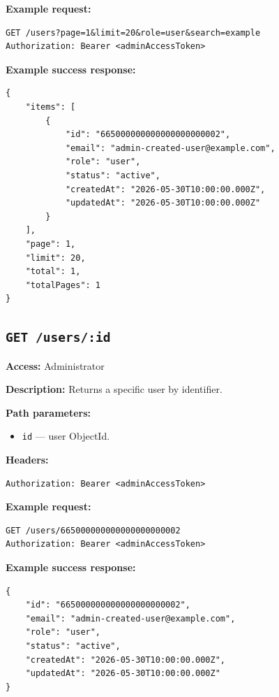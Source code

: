 \textbf{Example request:}

\begin{verbatim}
GET /users?page=1&limit=20&role=user&search=example
Authorization: Bearer <adminAccessToken>
\end{verbatim}

\pagebreak
\textbf{Example success response:}

\begin{verbatim}
{
    "items": [
        {
            "id": "665000000000000000000002",
            "email": "admin-created-user@example.com",
            "role": "user",
            "status": "active",
            "createdAt": "2026-05-30T10:00:00.000Z",
            "updatedAt": "2026-05-30T10:00:00.000Z"
        }
    ],
    "page": 1,
    "limit": 20,
    "total": 1,
    "totalPages": 1
}
\end{verbatim}

\subsection{\texttt{GET /users/:id}}

\textbf{Access:} Administrator

\textbf{Description:} Returns a specific user by identifier.

\textbf{Path parameters:}

\begin{itemize}
    \item \texttt{id} --- user ObjectId.
\end{itemize}

\textbf{Headers:}

\begin{verbatim}
Authorization: Bearer <adminAccessToken>
\end{verbatim}

\textbf{Example request:}

\begin{verbatim}
GET /users/665000000000000000000002
Authorization: Bearer <adminAccessToken>
\end{verbatim}

\textbf{Example success response:}

\begin{verbatim}
{
    "id": "665000000000000000000002",
    "email": "admin-created-user@example.com",
    "role": "user",
    "status": "active",
    "createdAt": "2026-05-30T10:00:00.000Z",
    "updatedAt": "2026-05-30T10:00:00.000Z"
}
\end{verbatim}

